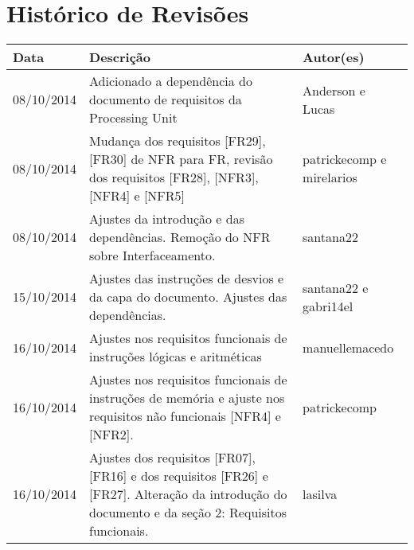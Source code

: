 \documentclass{article}
\begin{document}
\section*{\center Histórico de Revisões}
\vspace*{1cm}
\begin{table}[ht]
	\centering
	\begin{tabular}[pos]{|m{2cm} | m{7.2cm} | m{3.8cm}|} \hline \cellcolor[gray]{0.9}
		
		\textbf{Data} & \cellcolor[gray]{0.9}\textbf{Descrição} & \cellcolor[gray]{0.9} \textbf{Autor(es)}\\ \hline
		
		\small 08/10/2014 & \small Adicionado a dependência do documento de requisitos da Processing Unit & \small Anderson e Lucas \\ \hline 
		
		\small 08/10/2014 & \small Mudança dos requisitos [FR29], [FR30] de NFR para FR, revisão dos requisitos [FR28], [NFR3], [NFR4] e [NFR5] & \small patrickecomp e mirelarios \\ \hline
		
		\small 08/10/2014 & \small Ajustes da introdução e das dependências. Remoção do NFR sobre Interfaceamento. & \small santana22 \\ \hline
		
		\small 15/10/2014 & \small Ajustes das instruções de desvios e da capa do documento. Ajustes das dependências. & \small santana22 e gabri14el \\ \hline
		
		\small 16/10/2014 & \small Ajustes nos requisitos funcionais de instruções lógicas e aritméticas & \small manuellemacedo \\ \hline
        
		\small 16/10/2014 & \small Ajustes nos requisitos funcionais de instruções de memória e ajuste nos requisitos não funcionais [NFR4] e [NFR2]. & \small patrickecomp \\ \hline
		
		\small 16/10/2014 & \small Ajustes dos requisitos [FR07], [FR16] e dos requisitos [FR26] e [FR27]. Alteração da introdução do documento e da seção 2: Requisitos funcionais. & \small lasilva \\ \hline 
		
  \end{tabular}
\end{table}
		
\tableofcontents
\newpage
		
\end{document}
